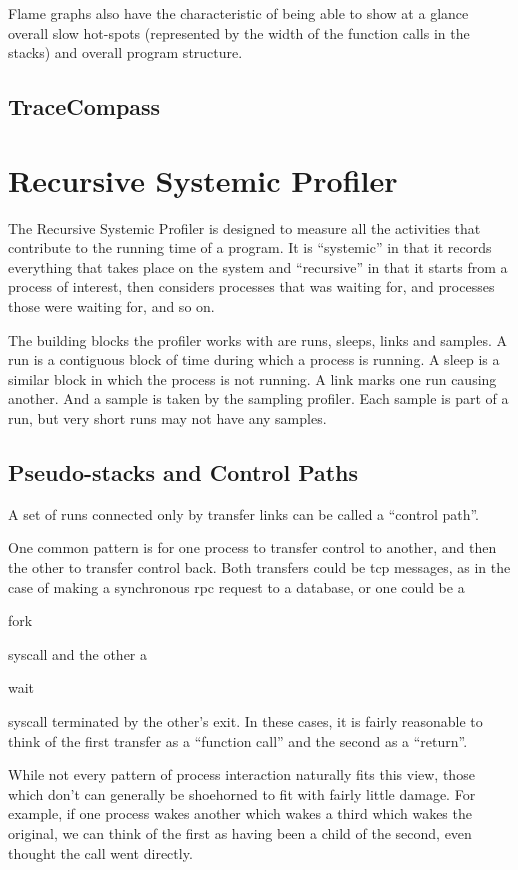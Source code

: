 \documentclass[10pt]{article}
\begin{document}
Flame graphs also have the characteristic of being able to show at a glance overall slow hot-spots (represented by the width of the function calls in the stacks) and overall program structure.

\subsection{TraceCompass}

\section{Recursive Systemic Profiler}

The Recursive Systemic Profiler is designed to measure all the activities that contribute to the running time of a program.  It is ``systemic'' in that it records everything that takes place on the system and ``recursive'' in that it starts from a process of interest, then considers processes that was waiting for, and processes those were waiting for, and so on.

The building blocks the profiler works with are runs, sleeps, links and samples.  A run is a contiguous block of time during which a process is running.  A sleep is a similar block in which the process is not running.  A link marks one run causing another.  And a sample is taken by the sampling profiler.  Each sample is part of a run, but very short runs may not have any samples.

\subsection{Pseudo-stacks and Control Paths}

A set of runs connected only by transfer links can be called a ``control path''.

One common pattern is for one process to transfer control to another, and then the other to transfer control back.  Both transfers could be tcp messages, as in the case of making a synchronous rpc request to a database, or one could be a \begin{tt}fork\end{tt} syscall and the other a \begin{tt}wait\end{tt} syscall terminated by the other's exit.  In these cases, it is fairly reasonable to think of the first transfer as a ``function call'' and the second as a ``return''.

While not every pattern of process interaction naturally fits this view, those which don't can generally be shoehorned to fit with fairly little damage.  For example, if one process wakes another which wakes a third which wakes the original, we can think of the first as having been a child of the second, even thought the call went directly.
\end{document}
